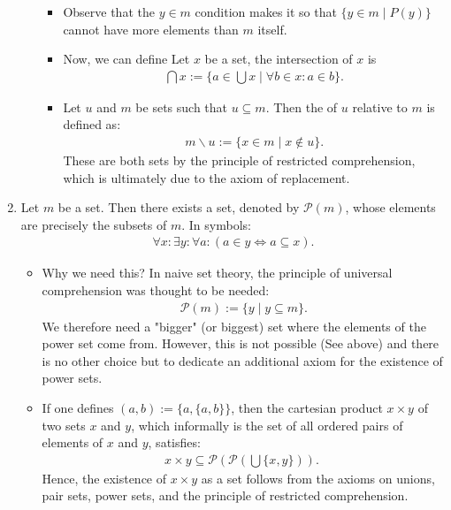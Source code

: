 \documentclass{article}
\begin{document}
\begin{enumerate}
\begin{itemize}
\begin{itemize}[$\ast$]
\item Observe that the $y \in m$ condition makes it so that $\{y \in m \mid P(y)\}$ cannot have more elements than $m$ itself.
    \item Now, we can define  Let $x$ be a set, the intersection of $x$ is
\begin{align*}
\bigcap x:=\{a \in \bigcup x \mid \forall b \in x: a \in b\} .
\end{align*}
\item  Let $u$ and $m$ be sets such that $u \subseteq m$. Then the  of $u$ relative to $m$ is defined as:
\begin{align*}
m \backslash u:=\{x \in m \mid x \notin u\} .
\end{align*}
These are both sets by the principle of restricted comprehension, which is ultimately due to the axiom of replacement.
\end{itemize}


\end{itemize}
\item {} Let $m$ be a set. Then there exists a set, denoted by $\mathcal{P}(m)$, whose elements are precisely the subsets of $m$. In symbols:
\begin{align*}
\forall x: \exists y: \forall a:(a \in y \Leftrightarrow a \subseteq x) .
\end{align*}

\begin{itemize}
\item Why we need this?  In naive set theory, the principle of universal comprehension was thought to be needed:
\begin{align*}
\mathcal{P}(m):=\{y \mid y \subseteq m\} .
\end{align*}
We therefore need a "bigger" (or biggest) set where the elements of the power set come from. However, this is not possible (See above) and there is no other choice but to dedicate an additional axiom for the existence of power sets.

    \item If one defines $(a, b):=\{a,\{a, b\}\}$, then the cartesian product $x \times y$ of two sets $x$ and $y$, which informally is the set of all ordered pairs of elements of $x$ and $y$, satisfies:
\begin{align*}
x \times y \subseteq \mathcal{P}(\mathcal{P}(\bigcup\{x, y\})) \text {. }
\end{align*}
Hence, the existence of $x \times y$ as a set follows from the axioms on unions, pair sets, power sets, and the principle of restricted comprehension.


\end{itemize}
\end{enumerate}
\end{document}

